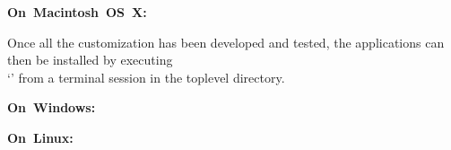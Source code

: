 \tertiaryEnd
{}
\begin{center}\textbf{On~Macintosh~OS~X:}\end{center}
Once all the customization has been developed and tested, the applications can then be
installed by executing\\
`' from a terminal session in the top\longDash{}level directory.
\begin{center}\textbf{On~Windows:}\end{center}
\TBD
\begin{center}\textbf{On~Linux:}\end{center}
\TBD
\tertiaryEnd
\secondaryEnd
\appendixEnd{}
